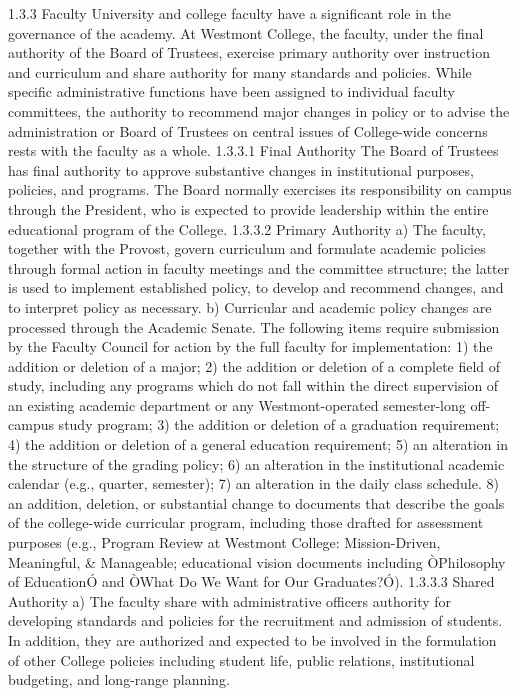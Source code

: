 \documentclass[letterpaper, 11pt]{article}
\begin{document}
1.3.3 Faculty
   University and college faculty have a significant role in the governance of the academy. At Westmont College, the faculty, under the final authority of the Board of Trustees, exercise primary authority over instruction and curriculum and share authority for many standards and policies.  While specific administrative functions have been assigned to individual faculty committees, the authority to recommend major changes in policy or to advise the administration or Board of Trustees on central issues of College-wide concerns rests with the faculty as a whole.
1.3.3.1 Final Authority
   The Board of Trustees has final authority to approve substantive changes in institutional purposes, policies, and programs.  The Board normally exercises its responsibility on campus through the President, who is expected to provide leadership within the entire educational program of the College.
1.3.3.2 Primary Authority
a) The faculty, together with the Provost, govern curriculum and formulate academic policies through formal action in faculty meetings and the committee structure; the latter is used to implement established policy, to develop and recommend changes, and to interpret policy as necessary.
b) Curricular and academic policy changes are processed through the Academic Senate. The following items require submission by the Faculty Council for action by the full faculty for implementation:
1) the addition or deletion of a major;
2) the addition or deletion of a complete field of study, including any programs which do not fall within the direct supervision of an existing academic department or any Westmont-operated semester-long off-campus study program;
3) the addition or deletion of a graduation requirement;
4) the addition or deletion of a general education requirement;
5) an alteration in the structure of the grading policy;
6) an alteration in the institutional academic calendar (e.g., quarter, semester);
7) an alteration in the daily class schedule.
8) an addition, deletion, or substantial change to documents that describe the
goals of the college-wide curricular program, including those drafted for
assessment purposes (e.g., Program Review at Westmont College: Mission-Driven,
Meaningful, \& Manageable; educational vision documents including ÒPhilosophy of EducationÓ and ÒWhat Do We Want for Our Graduates?Ó). 
1.3.3.3 Shared Authority
a) The faculty share with administrative officers authority for developing standards and policies for the recruitment and admission of students. In addition, they are authorized and expected to be involved in the formulation of other College policies including student life, public relations, institutional budgeting, and long-range planning.
\end{document}
